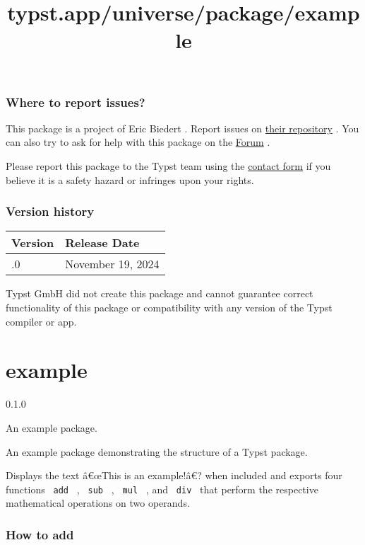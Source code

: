 \subsubsection{Where to report issues?}\label{where-to-report-issues}

This package is a project of Eric Biedert . Report issues on
\href{https://github.com/EpicEricEE/typst-marge}{their repository} . You
can also try to ask for help with this package on the
\href{https://forum.typst.app}{Forum} .

Please report this package to the Typst team using the
\href{https://typst.app/contact}{contact form} if you believe it is a
safety hazard or infringes upon your rights.

\label{versions}
\subsubsection{Version history}\label{version-history}

\begin{longtable}[]{@{}ll@{}}
\toprule\noalign{}
Version & Release Date \\
\midrule\noalign{}
\endhead
\bottomrule\noalign{}
\endlastfoot
0.1.0 & November 19, 2024 \\
\end{longtable}

Typst GmbH did not create this package and cannot guarantee correct
functionality of this package or compatibility with any version of the
Typst compiler or app.


\title{typst.app/universe/package/example}

\label{banner}
\section{example}\label{example}

{ 0.1.0 }

An example package.

\label{readme}
An example package demonstrating the structure of a Typst package.

Displays the text â€œThis is an example!â€? when included and exports
four functions \texttt{\ add\ } , \texttt{\ sub\ } , \texttt{\ mul\ } ,
and \texttt{\ div\ } that perform the respective mathematical operations
on two operands.

\subsubsection{How to add}\label{how-to-add}

